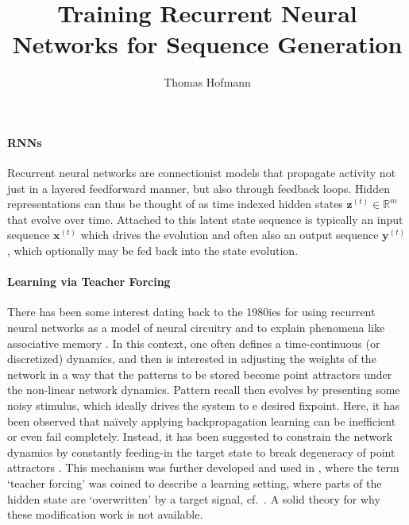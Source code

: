 \documentclass{article}
\title{Training Recurrent Neural Networks for Sequence Generation}
\author{Thomas Hofmann}
\newcommand{\up}[1]{^{(#1)}}
\newcommand{\y}{{\mathbf y}}
\newcommand{\x}{{\mathbf x}}
\newcommand{\z}{{\mathbf z}}
\renewcommand{\Re}{{\mathbb R}}
\begin{document}
\maketitle

\paragraph{RNNs} Recurrent neural networks are connectionist models that propagate activity not just in a layered feedforward manner, but also through  feedback loops. Hidden representations can thus be thought of as time indexed hidden states $\z \up t \in \Re^m$ that evolve over time. Attached to this latent state sequence is typically an input sequence $\x \up t$ which drives the evolution and often also an output sequence $\y \up t$, which optionally may be fed  back into the state evolution.  

\paragraph{Learning via Teacher Forcing} There has been some interest dating back to the 1980ies for using recurrent neural networks as a model of neural circuitry and to explain phenomena like associative memory \cite{hopfield1982neural,lapedes1986self}. In this context, one often defines a time-continuous (or discretized) dynamics, and then is interested in adjusting the weights of the network in a way that the patterns to be stored become point attractors under the non-linear network dynamics. Pattern recall then evolves by presenting some noisy stimulus, which ideally drives the system to \thispagestyle{?}e desired fixpoint. Here, it has been observed that na\"ively applying backpropagation learning can be inefficient or even fail completely. Instead, it has been suggested to constrain the network dynamics by constantly feeding-in the target state to break degeneracy of point attractors \cite[Eqs.~(8.5-8.7)]{pineda1988dynamics}. This mechanism was further developed and used in \cite{williams1989learning}, where the term `teacher forcing' was coined to describe a learning setting, where parts of the hidden state are `overwritten' by a target signal, cf.~\cite[Eq.~(17)]{williams1989learning}. A solid theory for why these modification work is not available.
\end{document}
